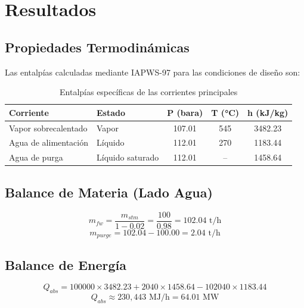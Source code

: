 \section{Resultados}

\subsection{Propiedades Termodinámicas}
Las entalpías calculadas mediante IAPWS-97 para las condiciones de diseño son:

\begin{table}[H]
	\centering
	\caption{Entalpías específicas de las corrientes principales}
	\label{tab:enthalpies}
	\begin{tabular}{@{}llccc@{}}
		\toprule
		\textbf{Corriente} & \textbf{Estado} & \textbf{P (bara)} & \textbf{T (\si{\celsius})} & \textbf{h (kJ/kg)} \\
		\midrule
		Vapor sobrecalentado & Vapor & 107.01 & 545 & 3482.23 \\
		Agua de alimentación & Líquido & 112.01 & 270 & 1183.44 \\
		Agua de purga & Líquido saturado & 112.01 & -- & 1458.64 \\
		\bottomrule
	\end{tabular}
\end{table}

\subsection{Balance de Materia (Lado Agua)}
\begin{equation}
	m_{fw} = \frac{m_{stm}}{1 - 0.02} = \frac{100}{0.98} = 102.04 \text{ t/h}
\end{equation}
\begin{equation}
	m_{purge} = 102.04 - 100.00 = 2.04 \text{ t/h}
\end{equation}

\subsection{Balance de Energía}
\begin{equation}
	Q_{abs} = 100000 \times 3482.23 + 2040 \times 1458.64 - 102040 \times 1183.44 
\end{equation}
\begin{equation}
	Q_{abs} \approx 230{,}443 \text{ MJ/h} = 64.01 \text{ MW}
\end{equation}

